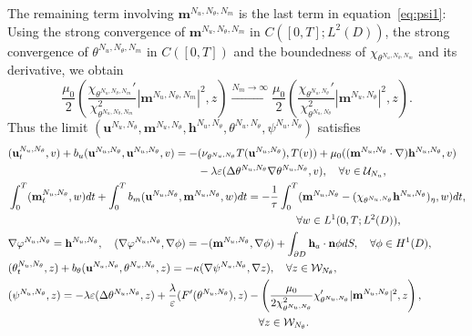 \documentclass[10pt,letterpaper,twoside]{amsart}
\theoremstyle{definition}{\newtheorem{definition}[lemma]{Definition}}
\theoremstyle{note}{\newtheorem{claim}{Claim}[section]
\newtheorem*{claim*}{Claim}}
\numberwithin{equation}{section}
\newcommand{\dom}{D}
\newcommand{\eps}{\varepsilon}
\newcommand{\Grad}{\nabla}
\newcommand{\bma}{\mathbf{m}^{N_u,N_\theta,N_m}}
\newcommand{\tha}{\theta^{N_u,N_\theta,N_m}}
\newcommand{\bmb}{\mathbf{m}^{N_u,N_\theta}}
\newcommand{\bhb}{\mathbf{h}^{N_u,N_\theta}}
\newcommand{\bub}{\mathbf{u}^{N_u,N_\theta}}
\newcommand{\thb}{\theta^{N_u,N_\theta}}
\newcommand{\phb}{\varphi^{N_u,N_\theta}}
\newcommand{\psib}{\psi^{N_u,N_\theta}}
\newcommand{\bh}{\mathbf{h}}
\begin{document}
 The remaining term involving $\bma$ is the last term in equation~\eqref{eq:psi1}: Using the strong convergence of $\bma$ in $C([0,T];L^2(\dom))$, the strong convergence of $\tha$ in $C([0,T])$ and the boundedness of $\chi_{\tha}$ and its derivative, we obtain
\begin{equation*}
	\frac{\mu_0}{2}\left(\frac{\chi_{\tha}'}{\chi_{\tha}^2}|\bma|^2,z\right)\stackrel{N_m\to\infty}{\longrightarrow}	\frac{\mu_0}{2}\left(\frac{\chi_{\thb}'}{\chi_{\thb}^2}|\bmb|^2,z\right).
\end{equation*}
Thus the limit $(\bub,\bmb,\bhb,\thb,\psi^{N_u,N_\theta})$ satisfies
\begin{subequations}\label{eq:Galerkinsolve2}
	\begin{align}
		&(\bub_t,v)+b_u(\bub,\bub,v)=-(\nu_{\thb} T(\bub),T(v))+\mu_0((\bmb\cdot\Grad)\bhb,v)\label{eq:NSdiscrete2}\\
		&   \hphantom{(\bub_t,v)+b_u(\bub,\bub,v)=-}       -\lambda\eps(\Delta\thb\Grad\thb,v), \quad \forall v\in \mathcal{U}_{N_u},\notag \\
		&\int_0^T(\bmb_t,w)dt+\int_0^T b_m(\bub,\bmb,w)dt =-\frac{1}{\tau}\int_0^T (\bmb-(\chi_{\thb}\bhb)_\eta,w)dt , \label{eq:meqdiscrete2}\\
		&\hphantom{ \int_0^T(\bmb_t,w)dt+\int_0^T b_m(\bub,\bmb,w)dt =-\frac{1}{\tau}\int_0^T   }        \forall w\in L^1(0,T;L^2(\dom)),\notag\\
		&\Grad\phb=\bhb,\quad (\Grad \phb,\Grad \phi) =-(\bmb,\Grad\phi)+\int_{\partial\dom}\bh_a\cdot\mathbf{n}\phi dS,\quad \forall \phi\in H^1(\dom),\label{eq:bcmaxwell2}\\
		&(\thb_t,z )+b_\theta(\bub,\thb,z)=-\kappa(\Grad\psib,\Grad z),\quad \forall z\in\mathcal{W}_{N_\theta},\label{eq:phasefielddiscrete2}\\
		&(\psib,z)= -\lambda\eps(\Delta\thb,z) +\frac{\lambda}{\eps}(F'(\thb),z)-\left(\frac{\mu_0}{2\chi_{\thb}^2}\chi'_{\thb}|\bmb|^2,z\right),\label{eq:psi2}\\
		&\hphantom{(\psib,z)= -\lambda\eps(\Delta\thb,z) +\frac{\lambda}{\eps}(F'(\thb),z)}\quad \forall z\in \mathcal{W}_{N_\theta}.\notag
	\end{align}
\end{subequations}
%
\end{document}
